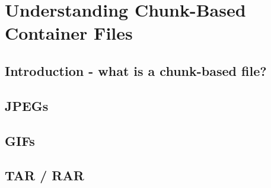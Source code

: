 \chapter{Understanding Chunk-Based Container Files}
\section{Introduction - what is a chunk-based file?}
\section{JPEGs}
\section{GIFs}
\section{TAR / RAR}
